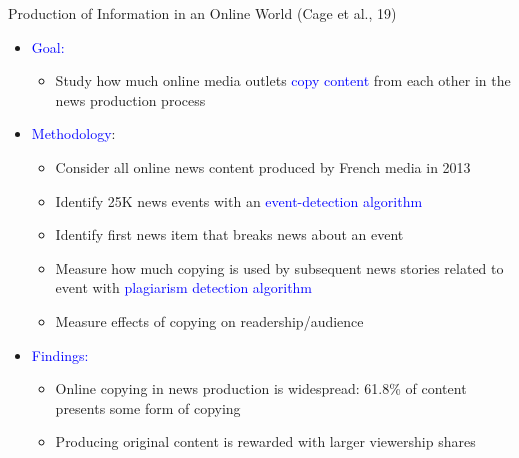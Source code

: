 \documentclass[english]{beamer}
\begin{document}
\begin{frame}{Production of Information in an Online World \normalsize{(Cage et al., 19)}}
\begin{itemize}
\setlength{\itemsep}{1em}
    \item \textcolor{blue}{Goal:}
    \vspace*{5pt}
    \begin{itemize}
    \setlength{\itemsep}{0.4em}
        \item Study how much online media outlets \textcolor{blue}{copy content} from each other in the news production process
    \end{itemize}
    
    \pause
    
    \item \textcolor{blue}{Methodology}:
    \vspace*{5pt}
    \begin{itemize}
        \setlength{\itemsep}{0.4em}
        \item Consider all online news content produced by French media in 2013
        \item Identify 25K news events with an \textcolor{blue}{event-detection algorithm}
        \item Identify first news item that breaks news about an event
        \item Measure how much copying is used by subsequent news stories related to event with \textcolor{blue}{plagiarism detection algorithm}
        \item Measure effects of copying on readership/audience
    \end{itemize}
    
        \pause
        
    \item \textcolor{blue}{Findings:}
    \vspace*{5pt}
    \begin{itemize}
        \setlength{\itemsep}{0.4em}
        \item Online copying in news production is widespread: 61.8\% of content presents some form of copying
        \item Producing original content is rewarded with larger viewership shares
    \end{itemize}
    
\end{itemize}
\end{frame}
\end{document}
